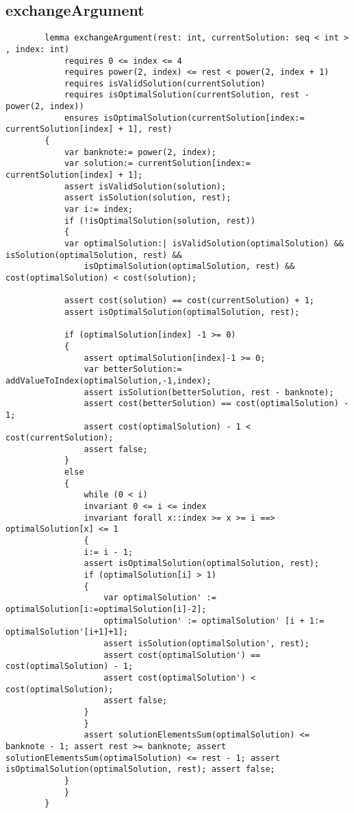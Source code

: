     \subsection{exchangeArgument}
    \begin{lstlisting}
        lemma exchangeArgument(rest: int, currentSolution: seq < int > , index: int)
            requires 0 <= index <= 4
            requires power(2, index) <= rest < power(2, index + 1)
            requires isValidSolution(currentSolution)
            requires isOptimalSolution(currentSolution, rest - power(2, index))
            ensures isOptimalSolution(currentSolution[index:= currentSolution[index] + 1], rest) 
        {
            var banknote:= power(2, index);
            var solution:= currentSolution[index:= currentSolution[index] + 1];
            assert isValidSolution(solution);
            assert isSolution(solution, rest);
            var i:= index;
            if (!isOptimalSolution(solution, rest)) 
            {
            var optimalSolution:| isValidSolution(optimalSolution) && isSolution(optimalSolution, rest) &&
                isOptimalSolution(optimalSolution, rest) && cost(optimalSolution) < cost(solution);

            assert cost(solution) == cost(currentSolution) + 1;
            assert isOptimalSolution(optimalSolution, rest);

            if (optimalSolution[index] -1 >= 0) 
            {
                assert optimalSolution[index]-1 >= 0;
                var betterSolution:= addValueToIndex(optimalSolution,-1,index);
                assert isSolution(betterSolution, rest - banknote);
                assert cost(betterSolution) == cost(optimalSolution) - 1;
                assert cost(optimalSolution) - 1 < cost(currentSolution);
                assert false;
            } 
            else 
            {
                while (0 < i)
                invariant 0 <= i <= index
                invariant forall x::index >= x >= i ==> optimalSolution[x] <= 1 
                {
                i:= i - 1;
                assert isOptimalSolution(optimalSolution, rest);
                if (optimalSolution[i] > 1) 
                {
                    var optimalSolution' := optimalSolution[i:=optimalSolution[i]-2];
                    optimalSolution' := optimalSolution' [i + 1:= optimalSolution'[i+1]+1];
                    assert isSolution(optimalSolution', rest);
                    assert cost(optimalSolution') == cost(optimalSolution) - 1;
                    assert cost(optimalSolution') < cost(optimalSolution);
                    assert false;
                }
                }
                assert solutionElementsSum(optimalSolution) <= banknote - 1; assert rest >= banknote; assert solutionElementsSum(optimalSolution) <= rest - 1; assert isOptimalSolution(optimalSolution, rest); assert false;
            }
            }
        }
    \end{lstlisting}

